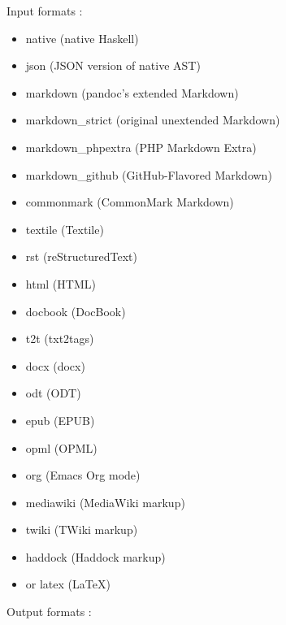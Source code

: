 \documentclass[journal,10pt,final]{IEEEtran}
\providecommand{\tightlist}{%
  \setlength{\itemsep}{0pt}\setlength{\parskip}{0pt}}
\begin{document}
Input formats :

\begin{itemize}
\tightlist
\item
  native (native Haskell)
\item
  json (JSON version of native AST)
\item
  markdown (pandoc's extended Markdown)
\item
  markdown\_strict (original unextended Markdown)
\item
  markdown\_phpextra (PHP Markdown Extra)
\item
  markdown\_github (GitHub-Flavored Markdown)
\item
  commonmark (CommonMark Markdown)
\item
  textile (Textile)
\item
  rst (reStructuredText)
\item
  html (HTML)
\item
  docbook (DocBook)
\item
  t2t (txt2tags)
\item
  docx (docx)
\item
  odt (ODT)
\item
  epub (EPUB)
\item
  opml (OPML)
\item
  org (Emacs Org mode)
\item
  mediawiki (MediaWiki markup)
\item
  twiki (TWiki markup)
\item
  haddock (Haddock markup)
\item
  or latex (LaTeX)
\end{itemize}

Output formats :
\end{document}
